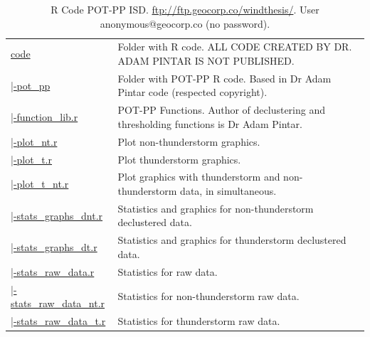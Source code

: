 \documentclass[12pt,oneside]{reedthesis}
\begin{document}
\begingroup\fontsize{7}{9}\selectfont
\begin{longtable}[t]{>{\raggedright\arraybackslash}p{1.3in}>{\raggedright\arraybackslash}p{4.9in}}
\caption[R Code POT-PP ISD]{\label{tab:codeisd}R Code POT-PP ISD. \href{ftp://ftp.geocorp.co/windthesis/}{ftp://ftp.geocorp.co/windthesis/}. User anonymous@geocorp.co (no password).}\\
\toprule
\multicolumn{1}{l}{Folder Tree - Ftp Links} & \multicolumn{1}{l}{Description}\\
\midrule
\href{ftp://ftp.geocorp.co/windthesis/code/}{code} & Folder with R code. ALL CODE CREATED BY DR. ADAM PINTAR IS NOT PUBLISHED.\\
\href{ftp://ftp.geocorp.co/windthesis/code/pot_pp/}{\;\;|-pot\_pp} & Folder with POT-PP R code. Based in Dr Adam Pintar code (respected copyright).\\
\href{ftp://ftp.geocorp.co/windthesis/code/pot_pp/function_lib.r}{\;\;\;\;|-function\_lib.r} & POT-PP Functions. Author of declustering and thresholding functions is Dr Adam Pintar.\\
\href{ftp://ftp.geocorp.co/windthesis/code/pot_pp/plot_nt.r}{\;\;\;\;|-plot\_nt.r} & Plot non-thunderstorm graphics.\\
\href{ftp://ftp.geocorp.co/windthesis/code/pot_pp/plot_t.r}{\;\;\;\;|-plot\_t.r} & Plot thunderstorm graphics.\\
\href{ftp://ftp.geocorp.co/windthesis/code/pot_pp/plot_t_nt.r}{\;\;\;\;|-plot\_t\_nt.r} & Plot graphics with thunderstorm and non-thunderstorm data, in simultaneous.\\
\href{ftp://ftp.geocorp.co/windthesis/code/pot_pp/statistics_and_graphics_declustered_nt.r}{\;\;\;\;|-stats\_graphs\_dnt.r} & Statistics and graphics for non-thunderstorm declustered data.\\
\href{ftp://ftp.geocorp.co/windthesis/code/pot_pp/statistics_and_graphics_declustered_t.r}{\;\;\;\;|-stats\_graphs\_dt.r} & Statistics and graphics for thunderstorm declustered data.\\
\href{ftp://ftp.geocorp.co/windthesis/code/pot_pp/statistics_raw_data.r}{\;\;\;\;|-stats\_raw\_data.r} & Statistics for raw data.\\
\href{ftp://ftp.geocorp.co/windthesis/code/pot_pp/statistics_raw_data_nt.r}{\;\;\;\;|-stats\_raw\_data\_nt.r} & Statistics for non-thunderstorm raw data.\\
\href{ftp://ftp.geocorp.co/windthesis/code/pot_pp/statistics_raw_data_t.r}{\;\;\;\;|-stats\_raw\_data\_t.r} & Statistics for thunderstorm raw data.\\

\end{longtable}
\end{document}
